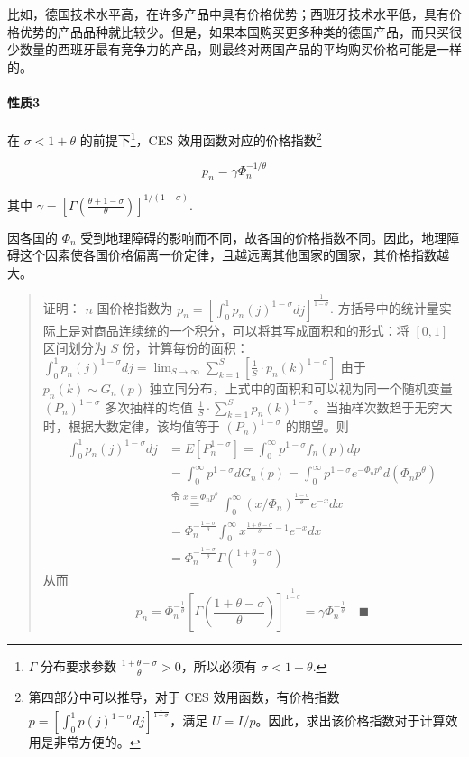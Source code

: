 \documentclass[
]{article}
\begin{document}
比如，德国技术水平高，在许多产品中具有价格优势；西班牙技术水平低，具有价格优势的产品品种就比较少。但是，如果本国购买更多种类的德国产品，而只买很少数量的西班牙最有竞争力的产品，则最终对两国产品的平均购买价格可能是一样的。

\hypertarget{ux6027ux8d283}{%
\paragraph{性质3}\label{ux6027ux8d283}}

在 \(\sigma < 1 + \theta\) 的前提下\footnote{\(\Gamma\) 分布要求参数 \(\frac{1+\theta-\sigma}{\theta}>0\)，所以必须有
  \(\sigma < 1 + \theta\).}，CES 效用函数对应的价格指数\footnote{第四部分中可以推导，对于 CES 效用函数，有价格指数
  \(p=\left[\int_0^1 p(j)^{1-\sigma}dj\right]^{\frac{1}{1-\sigma}}\)，满足
  \(U=I/p\)。因此，求出该价格指数对于计算效用是非常方便的。}

\[
p_{n}=\gamma \Phi_{n}^{-1 / \theta}  \tag{9}
\]

其中
\(\gamma=\left[\Gamma\left(\frac{\theta+1-\sigma}{\theta}\right)\right]^{1 /(1-\sigma)}\).

因各国的 \(\Phi_{n}\)
受到地理障碍的影响而不同，故各国的价格指数不同。因此，地理障碍这个因素使各国价格偏离一价定律，且越远离其他国家的国家，其价格指数越大。

\begin{quote}
证明： \(n\) 国价格指数为
\(p_n=\left[\int_0^1 p_n(j)^{1-\sigma}dj\right]^{\frac{1}{1-\sigma}}\).
方括号中的统计量实际上是对商品连续统的一个积分，可以将其写成面积和的形式：将
\([0,1]\) 区间划分为 \(S\)
份，计算每份的面积：\(\int_0^1 p_n(j)^{1-\sigma}dj=\lim_{S \to \infty} \sum_{k=1}^{S} \left[\frac{1}{S}\cdot p_{n}(k)^{1-\sigma}\right]\)
由于 \(p_n(k)\sim G_n(p)\) 独立同分布，上式中的面积和可以视为同一个随机变量
\((P_n)^{1-\sigma}\) 多次抽样的均值
\(\frac{1}{S}\cdot\sum_{k=1}^{S} p_{n}(k)^{1-\sigma}\)。当抽样次数趋于无穷大时，根据大数定律，该均值等于
\((P_n)^{1-\sigma}\) 的期望。则 \[\begin{aligned}
\int_0^1 p_n(j)^{1-\sigma}dj & = E\left[P_n^{1-\sigma}\right] = \int_{0}^{\infty}p^{1-\sigma}f_n(p)dp \\
&= \int_{0}^{\infty}p^{1-\sigma}dG_n(p)=\int_{0}^{\infty }p^{1-\sigma}e^{-\Phi_n p^\theta} d(\Phi_n p^\theta) \\
& \stackrel{\text{令 }x=\Phi_n p^{\theta}}{=} \int_{0}^{\infty}\left(x/\Phi_n\right)^{\frac{1-\sigma}{\theta}}e^{-x}dx \\
&= \Phi_n^{-\frac{1-\sigma}{\theta}}\int_{0}^{\infty }x^{\frac{1+\theta-\sigma}{\theta}-1}e^{-x}dx \\
&=\Phi_n^{-\frac{1-\sigma}{\theta}}\Gamma (\frac{1+\theta-\sigma}{\theta})
\end{aligned}\] 从而
\[ p_n=\Phi_n^{-\frac{1}{\theta}}\left[\Gamma (\frac{1+\theta-\sigma}{\theta})\right]^{\frac{1}{1-\sigma}}=\gamma \Phi_n^{-\frac{1}{\theta}} \quad \blacksquare \]
\end{quote}
\end{document}
